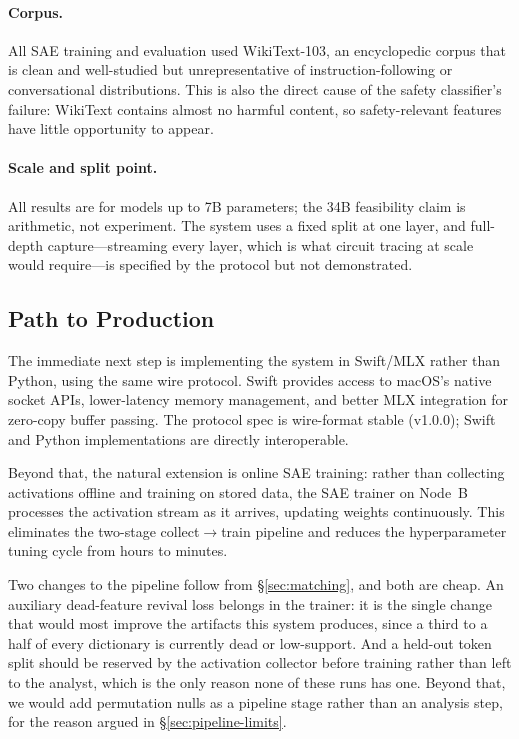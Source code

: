 \documentclass[11pt]{article}
\begin{document}
\paragraph{Corpus.} All SAE training and evaluation used WikiText-103, an encyclopedic corpus that is clean and well-studied but unrepresentative of instruction-following or conversational distributions. This is also the direct cause of the safety classifier's failure: WikiText contains almost no harmful content, so safety-relevant features have little opportunity to appear.

\paragraph{Scale and split point.} All results are for models up to 7B parameters; the 34B feasibility claim is arithmetic, not experiment. The system uses a fixed split at one layer, and full-depth capture---streaming every layer, which is what circuit tracing at scale would require---is specified by the protocol but not demonstrated.

\subsection{Path to Production}
\label{sec:production}

The immediate next step is implementing the system in Swift/MLX rather than Python, using the same wire protocol. Swift provides access to macOS's native socket APIs, lower-latency memory management, and better MLX integration for zero-copy buffer passing. The protocol spec is wire-format stable (v1.0.0); Swift and Python implementations are directly interoperable.

Beyond that, the natural extension is online SAE training: rather than collecting activations offline and training on stored data, the SAE trainer on Node~B processes the activation stream as it arrives, updating weights continuously. This eliminates the two-stage collect$\to$train pipeline and reduces the hyperparameter tuning cycle from hours to minutes.

Two changes to the pipeline follow from \S\ref{sec:matching}, and both are cheap. An auxiliary dead-feature revival loss \citep{gao2024scaling} belongs in the trainer: it is the single change that would most improve the artifacts this system produces, since a third to a half of every dictionary is currently dead or low-support. And a held-out token split should be reserved by the activation collector before training rather than left to the analyst, which is the only reason none of these runs has one. Beyond that, we would add permutation nulls as a pipeline stage rather than an analysis step, for the reason argued in \S\ref{sec:pipeline-limits}.
\end{document}
